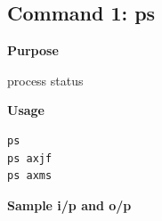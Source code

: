\subsection{Command 1: ps} 
\textbf{Purpose}
\begin{flushleft}
 process status
\end{flushleft}
\textbf{Usage}
\begin{verbatim}
ps
ps axjf
ps axms
\end{verbatim}
\textbf{Sample i/p and o/p}
\begin{figure}[H] 
\end{figure}
